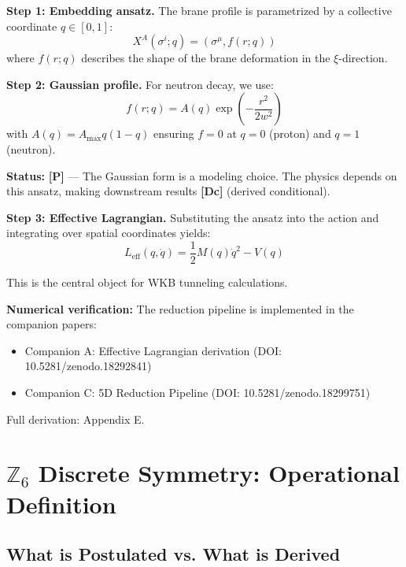 \documentclass[11pt,a4paper]{article}
\newcommand{\tagP}{\textcolor{red!70!black}{\textbf{[P]}}}
\newcommand{\tagDc}{\textcolor{blue!70!black}{\textbf{[Dc]}}}
\begin{document}
\textbf{Step 1: Embedding ansatz.} The brane profile is parametrized by a collective coordinate $q \in [0,1]$:
\begin{equation}
    X^A(\sigma^i; q) = (\sigma^\mu, f(r; q))
\end{equation}
where $f(r; q)$ describes the shape of the brane deformation in the $\xi$-direction.

\textbf{Step 2: Gaussian profile.} For neutron decay, we use:
\begin{equation}
    f(r; q) = A(q) \exp\left( -\frac{r^2}{2w^2} \right)
    \label{eq:gaussian_profile}
\end{equation}
with $A(q) = A_{\max} q(1-q)$ ensuring $f = 0$ at $q = 0$ (proton) and $q = 1$ (neutron).

\textbf{Status:} \tagP{} --- The Gaussian form is a modeling choice. The physics depends on this ansatz, making downstream results \tagDc{} (derived conditional).

\textbf{Step 3: Effective Lagrangian.} Substituting the ansatz into the action and integrating over spatial coordinates yields:
\begin{equation}
    L_{\text{eff}}(q, \dot{q}) = \frac{1}{2} M(q) \dot{q}^2 - V(q)
    \label{eq:L_eff}
\end{equation}

This is the central object for WKB tunneling calculations.

\begin{scriptbox}
\textbf{Numerical verification:} The reduction pipeline is implemented in the companion papers:
\begin{itemize}[nosep]
    \item Companion A: Effective Lagrangian derivation (DOI: 10.5281/zenodo.18292841)
    \item Companion C: 5D Reduction Pipeline (DOI: 10.5281/zenodo.18299751)
\end{itemize}
Full derivation: Appendix E.
\end{scriptbox}

\section{$\mathbb{Z}_6$ Discrete Symmetry: Operational Definition}
\label{sec:Z6_symmetry}

\subsection{What is Postulated vs. What is Derived}
\end{document}
